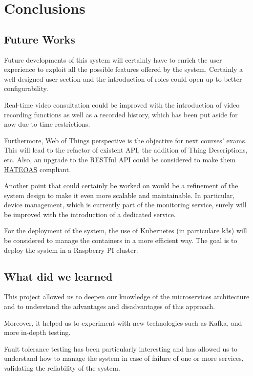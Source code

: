 \documentclass{scrartcl}
\begin{document}
    \section{Conclusions}

    \subsection{Future Works}

    Future developments of this system will certainly have to enrich the user experience to exploit all the possible features offered by the system.
    Certainly a well-designed user section and the introduction of roles could open up to better configurability.

    Real-time video consultation could be improved with the introduction of video recording functions as well as a recorded history,
    which has been put aside for now due to time restrictions.

    Furthermore, Web of Things perspective is the objective for next courses' exams.
    This will lead to the refactor of existent API, the addition of Thing Descriptions, etc.
    Also, an upgrade to the RESTful API could be considered to make them \href{https://en.wikipedia.org/wiki/HATEOAS}{HATEOAS} compliant.

    Another point that could certainly be worked on would be a refinement of the system design to make it even more scalable and maintainable.
    In particular, device management, which is currently part of the monitoring service, surely will be improved with the introduction of a dedicated service.

    For the deployment of the system, the use of Kubernetes (in particulare k3s) will be considered to manage the containers in a more efficient way.
    The goal is to deploy the system in a Raspberry PI cluster.

    \subsection{What did we learned}

    This project allowed us to deepen our knowledge of the microservices architecture and to understand the advantages and disadvantages of this approach.

    Moreover, it helped us to experiment with new technologies such as Kafka, and more in-depth testing.

    Fault tolerance testing has been particularly interesting and has allowed us to understand how to manage the system in case of failure of one or more services, validating the reliability of the system.

%    
\end{document}

